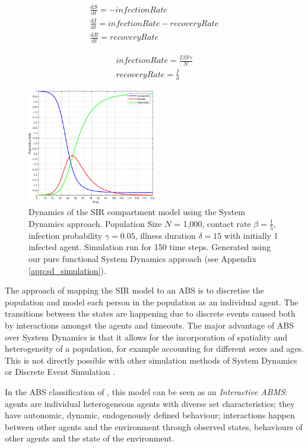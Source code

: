 \begin{equation}
\begin{aligned}
\frac{\mathrm d S}{\mathrm d t} = -infectionRate \\
\frac{\mathrm d I}{\mathrm d t} = infectionRate - recoveryRate \\
\frac{\mathrm d R}{\mathrm d t} = recoveryRate 
\end{aligned}
\end{equation}

\begin{equation}
\begin{aligned}
infectionRate = \frac{I \beta S \gamma}{N} \\
recoveryRate = \frac{I}{\delta} 
\end{aligned}
\end{equation}

\begin{figure}
	\centering
	\includegraphics[width=0.5\textwidth, angle=0]{./fig/timedriven/SIR_SD_1000agents_150t_001dt.png}
	\caption[Dynamics of the SIR compartment model using the System Dynamics approach]{Dynamics of the SIR compartment model using the System Dynamics approach. Population Size $N$ = 1,000, contact rate $\beta =  \frac{1}{5}$, infection probability $\gamma = 0.05$, illness duration $\delta = 15$ with initially 1 infected agent. Simulation run for 150 time steps. Generated using our pure functional System Dynamics approach (see Appendix \ref{app:sd_simulation}).}
	\label{fig:sir_sd_dynamics}
\end{figure}

The approach of mapping the SIR model to an ABS is to discretise the population and model each person in the population as an individual agent. The transitions between the states are happening due to discrete events caused both by interactions amongst the agents and timeouts. The major advantage of ABS over System Dynamics is that it allows for the incorporation of spatiality and heterogeneity of a population, for example accounting for different sexes and ages. This is not directly possible with other simulation methods of System Dynamics or Discrete Event Simulation \cite{zeigler_theory_2000}.

In the ABS classification of \cite{macal_everything_2016}, this model can be seen as an \textit{Interactive ABMS}: agents are individual heterogeneous agents with diverse set characteristics; they have autonomic, dynamic, endogenously defined behaviour; interactions happen between other agents and the environment through observed states, behaviours of other agents and the state of the environment.